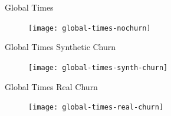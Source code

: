 \begin{frame}{Global Times}
	\begin{figure}
		\texttt{[image: global-times-nochurn]}
	\end{figure}
\end{frame}

\begin{frame}{Global Times Synthetic Churn}
	\begin{figure}
		\texttt{[image: global-times-synth-churn]}
	\end{figure}
\end{frame}

\begin{frame}{Global Times Real Churn}
	\begin{figure}
		\texttt{[image: global-times-real-churn]}
	\end{figure}
\end{frame}




